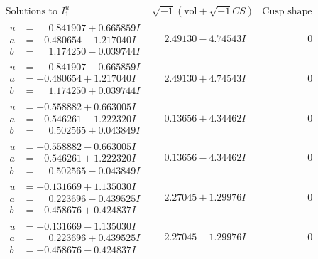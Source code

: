 \documentclass[1p]{elsarticle_modified}
\theoremstyle{definition}
\newcommand{\I}{\sqrt{-1}}
\begin{document}
$$\begin{array}{c|c|c}  
\text{Solutions to }I^u_{1}& \I (\text{vol} + \sqrt{-1}CS) & \text{Cusp shape}\\
 \hline 
\begin{aligned}
u &= \phantom{-}0.841907 + 0.665859 I \\
a &= -0.480654 - 1.217040 I \\
b &= \phantom{-}1.174250 - 0.039744 I\end{aligned}
 & \phantom{-}2.49130 - 4.74543 I & \phantom{-0.000000 } 0 \\ \hline\begin{aligned}
u &= \phantom{-}0.841907 - 0.665859 I \\
a &= -0.480654 + 1.217040 I \\
b &= \phantom{-}1.174250 + 0.039744 I\end{aligned}
 & \phantom{-}2.49130 + 4.74543 I & \phantom{-0.000000 } 0 \\ \hline\begin{aligned}
u &= -0.558882 + 0.663005 I \\
a &= -0.546261 - 1.222320 I \\
b &= \phantom{-}0.502565 + 0.043849 I\end{aligned}
 & \phantom{-}0.13656 + 4.34462 I & \phantom{-0.000000 } 0 \\ \hline\begin{aligned}
u &= -0.558882 - 0.663005 I \\
a &= -0.546261 + 1.222320 I \\
b &= \phantom{-}0.502565 - 0.043849 I\end{aligned}
 & \phantom{-}0.13656 - 4.34462 I & \phantom{-0.000000 } 0 \\ \hline\begin{aligned}
u &= -0.131669 + 1.135030 I \\
a &= \phantom{-}0.223696 - 0.439525 I \\
b &= -0.458676 + 0.424837 I\end{aligned}
 & \phantom{-}2.27045 + 1.29976 I & \phantom{-0.000000 } 0 \\ \hline\begin{aligned}
u &= -0.131669 - 1.135030 I \\
a &= \phantom{-}0.223696 + 0.439525 I \\
b &= -0.458676 - 0.424837 I\end{aligned}
 & \phantom{-}2.27045 - 1.29976 I & \phantom{-0.000000 } 0 \\ \hline\begin{aligned}

\end{aligned}
\end{array}$$
\end{document}
